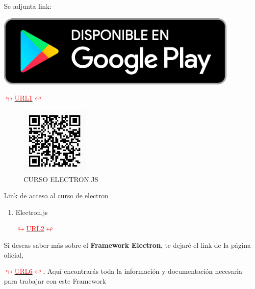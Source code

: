 Se adjunta link:
 \begin{minipage}[c]{0,19 \textwidth}
 \href{https://play.google.com/store/apps/details?id=com.teacapps.barcodescanner}{
 \includegraphics[width=0.9\textwidth]{img/google play.png}
 }\end{minipage}
 \hyperlink{linkapp}{\textcolor{red}{$\looparrowright$URL1$\looparrowleft$}}
\begin{center}
 \begin{figure}[H]
    \centering
 \includegraphics[width=0.3\textwidth]{img/QR2.jpeg}   
    \caption{CURSO ELECTRON.JS}
 \label{fig:ELECTRONQR}
 \end{figure}
                                           
\end{center}

Link de acceso al curso de electron

\begin{enumerate}
\renewcommand{\theenumi}{\Alph{enumi}} %
    \item  Electron.js\begin{minipage}[c]{0,17 \textwidth}\href{https://youtube.com/playlist?list=PL2PZw96yQChzi-lLw6rqqAPRkNXSOeqtr}{
 \def\svgwidth{0.9\textwidth}
 } 
 \end{minipage}\hyperlink{CURSOELECTRON}{\textcolor{red}{$\looparrowright$URL2$\looparrowleft$}}
\end{enumerate}
\newpage
 Si deseas saber más sobre el \textbf{Framework Electron}, te dejaré el link de la página oficial,\newline \begin{minipage}[c]{0,17 \textwidth}
 \href{https://www.electronjs.org/}{
 \def\svgwidth{0.9\textwidth}
 } 
 \end{minipage}\hyperlink{oficialpagina}{\textcolor{red}{$\looparrowright$URL6$\looparrowleft$}}. Aquí encontrarás toda la información y documentación necesaria para trabajar con este Framework
 
